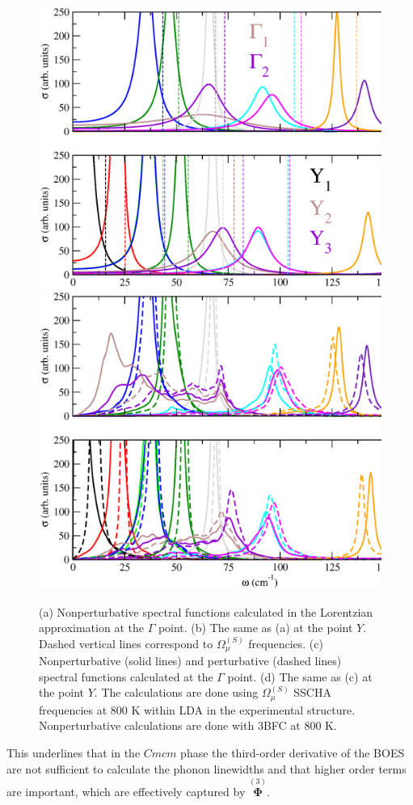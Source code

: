 \begin{figure}[th]
\begin{center}
\includegraphics[width=0.8\linewidth]{Figures/spectrum-lorentzian-snse.eps}
\includegraphics[width=0.8\linewidth]{Figures/spf-p-np-snse.eps}
	\caption[Perturbative and nonperturbative spectral functions in SnSe.]{(a) Nonperturbative spectral functions 
	calculated in the Lorentzian approximation at the $\Gamma$ point. (b) The same as (a) at the point $Y$. 
	Dashed vertical lines correspond to $\Omega^{(S)}_{\mu}$ frequencies. (c) Nonperturbative (solid lines) and 
	perturbative (dashed lines) spectral functions calculated at the $\Gamma$ point. (d) The same as (c) at the 
	point $Y$. The calculations are done using $\Omega^{(S)}_{\mu}$ SSCHA frequencies at $800$ K within LDA in 
	the experimental structure. Nonperturbative calculations are done with 3BFC at $800$ K.}
\label{spf-p-np}
\end{center}
\end{figure}
This underlines that in the $Cmcm$ phase the third-order derivative of the BOES are not sufficient to calculate the phonon linewidths and that higher order terms are important, which are effectively 
captured by $\overset{(3)}{\boldsymbol{\Phi}}$. \\

